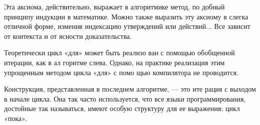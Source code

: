 Эта аксиома,  действительно,  выражает  в  алгоритмике  метод,  по­
добный принципу индукции в математике. Можно также выразить эту 
аксиому  в  слегка отличной форме,  изменив  индексацию  утверждений 
или действий... Все зависит от контекста и от ясности доказательства.
					Теоретически цикл «для» может быть реализо­
					ван с помощью обобщенной итерации, как в ал­
					горитме слева. Однако, на практике реализация 
						этим упрощенным методом цикла «для» с помо­
										щью компилятора не проводится.

\noindent Конструкция, представленная в последнем алгоритме, — это ите­
рация с выходом в начале цикла. Она так часто используется, что все 
языки программирования, достойные так называться, имеют особую 
структуру для ее выражения: цикл «пока».
\pagebreak

